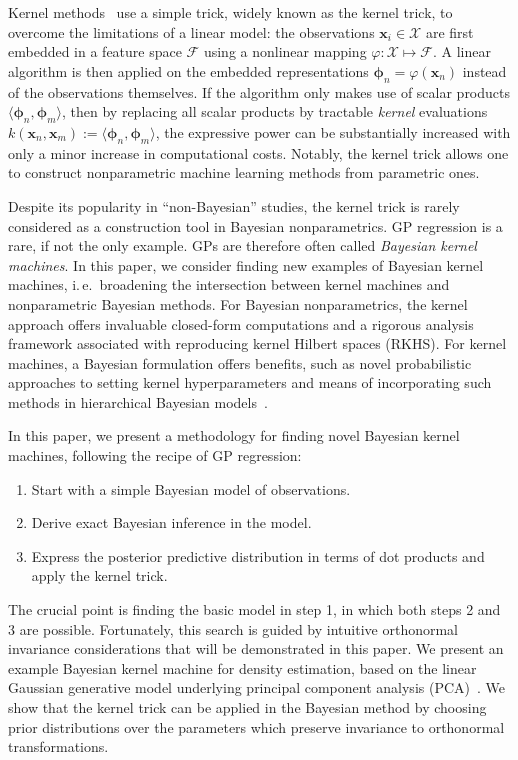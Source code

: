 \documentclass[twoside]{article}
\newcommand{\ie}{i.\,e.\ }
\begin{document}
Kernel methods~\cite{Hofman2008,Scholkopf2002} use a simple trick, widely known as the kernel trick, to overcome the limitations of a linear model: the observations ${\bm{x}_i\in\mathcal{X}}$ are first embedded in a feature space $\mathcal{F}$ using a nonlinear mapping ${\varphi:\mathcal{X} \mapsto \mathcal{F}}$. A linear algorithm is then applied on the embedded representations $\bm{\phi}_n = \varphi(\bm{x}_n)$ instead of the observations themselves. If the algorithm only makes use of scalar products $\langle\bm{\phi}_n,\bm{\phi}_m\rangle$, then by replacing all scalar products by tractable \emph{kernel} evaluations ${k(\bm{x}_n,\bm{x}_m) := \langle\bm{\phi}_n,\bm{\phi}_m\rangle}$, the expressive power can be substantially increased with only a minor increase in computational costs. Notably, the kernel trick allows one to construct nonparametric machine learning methods from parametric ones.

Despite its popularity in ``non-Bayesian'' studies, the kernel trick is rarely considered as a construction tool in Bayesian nonparametrics. GP regression is a rare, if not the only example. GPs are therefore often called \emph{Bayesian kernel machines}. In this paper,  we consider finding new examples of Bayesian kernel machines, \ie broadening the intersection between kernel machines and nonparametric Bayesian methods. For Bayesian nonparametrics, the kernel approach offers invaluable closed-form computations and a rigorous analysis framework associated with reproducing kernel Hilbert spaces (RKHS). For kernel machines, a Bayesian formulation offers benefits, such as novel probabilistic approaches to setting kernel hyperparameters and means of incorporating such methods in hierarchical Bayesian models~\cite{Rasmussen2002,Chu2007,Adams2009}.

In this paper, we present a methodology for finding novel Bayesian kernel machines, following the recipe of GP regression:
\begin{enumerate}
\addtolength{\itemsep}{-2mm}
 \item Start with a simple Bayesian model of observations.
 \item Derive exact Bayesian inference in the model.
 \item Express the posterior predictive distribution in terms of dot products and apply the kernel trick.
\end{enumerate}

The crucial point is finding the basic model in step 1, in which both steps 2 and 3 are possible. Fortunately, this search is guided by intuitive orthonormal invariance considerations that will be demonstrated in this paper. We present an example Bayesian kernel machine for density estimation, based on the linear Gaussian generative model underlying principal component analysis (PCA)~\cite{Roweis1999}. We show that the kernel trick can be applied in the Bayesian method by choosing prior distributions over the parameters which preserve invariance to orthonormal transformations.
\end{document}
